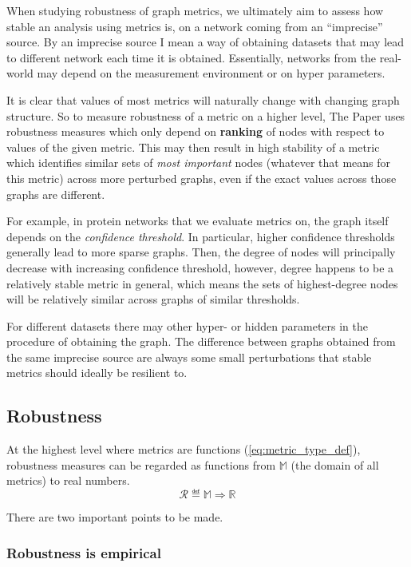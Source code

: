 When studying robustness of graph metrics, we ultimately aim to assess how stable an analysis using metrics is, on a network coming from an ``imprecise'' source.
By an imprecise source I mean a way of obtaining datasets that may lead to different network each time it is obtained.
Essentially, networks from the real-world may depend on the measurement environment or on hyper parameters.

It is clear that values of most metrics will naturally change with changing graph structure.
So to measure robustness of a metric on a higher level, The Paper uses robustness measures which only depend on \textbf{ranking} of nodes with respect to values of the given metric.
This may then result in high stability of a metric which identifies similar sets of \textsl{most important} nodes (whatever that means for this metric) across more perturbed graphs, even if the exact values across those graphs are different.

\parspace

For example, in protein networks that we evaluate metrics on, the graph itself depends on the \textsl{confidence threshold}.
In particular, higher confidence thresholds generally lead to more sparse graphs.
Then, the degree of nodes will principally decrease with increasing confidence threshold, however, degree happens to be a relatively stable metric in general, which means the sets of highest-degree nodes will be relatively similar across graphs of similar thresholds.

For different datasets there may other hyper- or hidden parameters in the procedure of obtaining the graph.
The difference between graphs obtained from the same imprecise source are always some small perturbations that stable metrics should ideally be resilient to.

\subsection{Robustness}

At the highest level where metrics are functions (\autoref{eq:metric_type_def}), robustness measures can be regarded as functions from $\mathbb{M}$ (the domain of all metrics) to real numbers.
\begin{equation}
    \mathcal{R} \eqdef \mathbb{M} \Rightarrow \mathbb{R}
\end{equation}

There are two important points to be made.

\subsubsection*{Robustness is empirical}

